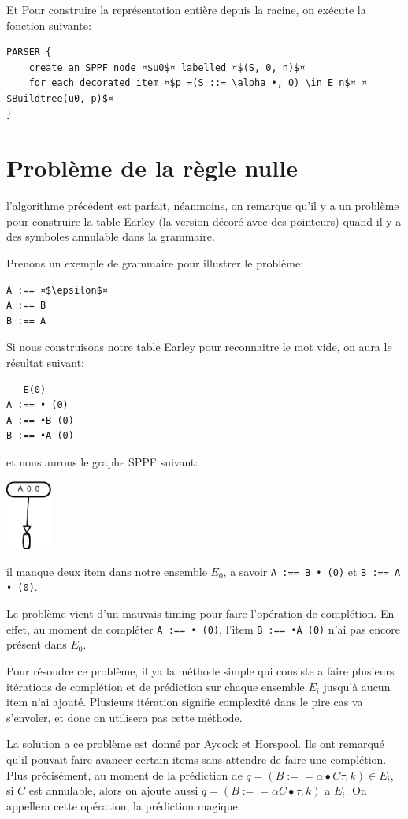 \documentclass[10pt]{report}
\begin{document}
Et Pour construire la représentation entière depuis la racine, on exécute la fonction suivante: 

\begin{lstlisting}[frame=single]		
PARSER { 
	create an SPPF node ¤$u0$¤ labelled ¤$(S, 0, n)$¤
	for each decorated item ¤$p =(S ::= \alpha •, 0) \in E_n$¤ ¤$Buildtree(u0, p)$¤ 
}
\end{lstlisting}

\section{Problème de la règle nulle}
l'algorithme précédent est parfait, néanmoins, on remarque qu'il y a un problème pour construire la table Earley (la version décoré avec des pointeurs) quand il y a des symboles annulable dans la grammaire.

Prenons un exemple de grammaire pour illustrer le problème:
\begin{lstlisting}		
A :== ¤$\epsilon$¤
A :== B
B :== A
\end{lstlisting}

Si nous construisons notre table Earley pour reconnaitre le mot vide, on aura le résultat suivant:
\begin{lstlisting}
   E(0)	
A :== • (0)
A :== •B (0)
B :== •A (0)
\end{lstlisting}
et nous aurons le graphe SPPF suivant:

\includegraphics[width=1.5cm]{Diagramme6.eps}

il manque deux item dans notre ensemble $E_0$, a savoir \lstinline|A :== B • (0)| et \lstinline|B :== A • (0)|.

Le problème vient d'un mauvais timing pour faire l'opération de complétion. En effet, au moment de compléter \lstinline|A :== • (0)|, l'item \lstinline|B :== •A (0)| n'ai pas encore présent dans $E_0$.

Pour résoudre ce problème, il ya la méthode simple qui consiste a faire plusieurs itérations de complétion et de prédiction sur chaque ensemble $E_i$ jusqu'à aucun item n'ai ajouté. Plusieurs itération signifie complexité dans le pire cas va s'envoler, et donc on utilisera pas cette méthode.

La solution a ce problème est donné par Aycock et Horspool\cite{Aycock}. Ils ont remarqué qu'il pouvait faire avancer certain items sans attendre de faire une complétion. Plus précisément, au moment de la prédiction de $q = (B :== \alpha • C \tau, k) \in E_i$, si $C$ est annulable, alors on ajoute aussi $q = (B :== \alpha C • \tau, k)$ a $E_i$. On appellera cette opération, la prédiction magique.
\end{document}
